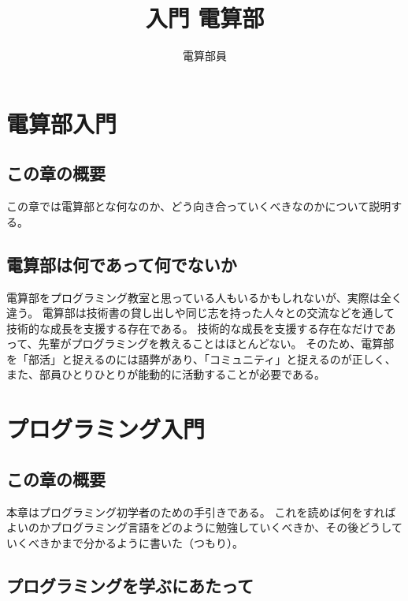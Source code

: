 \documentclass[lualatex,ja=standard,12pt,a4j]{bxjsbook}
\title{入門 電算部}
\author{電算部員}
\begin{document}
	\tableofcontents
	\chapter{電算部入門}
		\section{この章の概要}
			この章では電算部とな何なのか、どう向き合っていくべきなのかについて説明する。
		\section{電算部は何であって何でないか}
			電算部をプログラミング教室と思っている人もいるかもしれないが、実際は全く違う。
			電算部は技術書の貸し出しや同じ志を持った人々との交流などを通して技術的な成長を支援する存在である。
			技術的な成長を支援する存在なだけであって、先輩がプログラミングを教えることはほとんどない。
			そのため、電算部を「部活」と捉えるのには語弊があり、「コミュニティ」と捉えるのが正しく、
			また、部員ひとりひとりが能動的に活動することが必要である。
	\chapter{プログラミング入門}
		\section{この章の概要}
                本章はプログラミング初学者のための手引きである。
                これを読めば何をすればよいのかプログラミング言語をどのように勉強していくべきか、その後どうしていくべきかまで分かるように書いた（つもり）。
		\section{プログラミングを学ぶにあたって}
\end{document}
